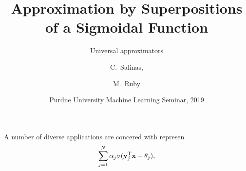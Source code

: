 \documentclass[11pt,letterpape]{beamer}
\title[Approximation by a Sigmoidal Function] 
{Approximation by Superpositions of a Sigmoidal Function}
\subtitle{Universal approximators}
\author[C.\ Salinas, M.\ Ruby] 
{C.\ Salinas,%
  \and M.\ Ruby%
}
\institute[Purdue University] %
{
  Department of Mathematics\\
  Purdue University
 }
\date[Spring 2019] %
{Purdue University Machine Learning Seminar, 2019}
\begin{document}
\frame{\titlepage}

\begin{frame}
  A number of diverse applications are concered with represen
  \[
    \sum_{j=1}^N\alpha_j\sigma(\mathbf{y}_j^{\mathrm{T}}\mathbf{x}+\theta_j),
  \]
\end{frame}
\end{document}

